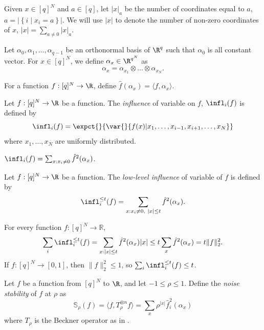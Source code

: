 \begin{definition}
  Given $x\in [q]^N$ and $a\in[q]$, let $|x|_a$ be the number of coordinates
equal to $a$, $a=\left| \left\{ i\mid x_i = a\right\}\right|$.
We will use $|x|$ to denote the number of non-zero coordinates of $x$,
$|x| = \sum_{a\neq 0} |x|_a$.
\end{definition}
\begin{definition}
  Let $\alpha_0,\alpha_1,\ldots,\alpha_{q-1}$ be an orthonormal basis
  of $\R^q$ such that $\alpha_0$ is all constant vector. For
  $x\in[q]^N$, we define $\alpha_x \in \R^{q^N}$ as
  \[ \alpha_x = \alpha_{x_1}\otimes \ldots \otimes \alpha_{x_N}.\] 
\end{definition}
\begin{definition}
  For a function $f:[q]^N\to\R$, define $\hat{f}(\alpha_x) =
  \langle f, \alpha_x \rangle$.
\end{definition}
%
\begin{definition}
  Let $f:[q]^N\rightarrow \R$ be a function. The
  \emph{influence} of  variable on $f$, $\infl_i(f)$ is
  defined by
  \[ \infl_i(f) = 
      \expct{}
            {\var{}{f(x)|x_1,\ldots,x_{i-1},x_{i+1},\ldots,x_N}}\]
  where $x_1,\ldots,x_N$ are uniformly distributed.
%
\end{definition}
\begin{observation}
  $\infl_i (f) = \sum_{x:x_i\neq 0} \hat{f}^2(\alpha_x)$.
\end{observation}
%
\begin{definition}
  Let $f:[q]^N\rightarrow \R$ be a function. The \emph{low-level
    influence} of  variable of $f$ is defined by
  \[ \infl_i^{\le t}(f) = \sum_{x:x_i\neq 0,\ |x|\le t} \hat{f}^2(\alpha_x).\]
\end{definition}
%
\begin{observation}
  For every function $f:[q]^N\to\mathbb{R}$, \[\sum_i \infl_i^{\le
    t}(f) = \sum_{x:|x|\le t} \hat{f}^2(\alpha_x) |x|\le t \sum_x
  \hat{f}^2(\alpha_x) = t \|f\|^2_2.\] If $f:[q]^N\to[0,1]$, then
  $\|f\|^2_2 \le 1$, so $\sum_i \infl_i^{\le t}(f) \le t$.
\end{observation}
%
\begin{definition}
  Let $f$ be a function from $[q]^N$ to $\R$, and let $-1\le \rho\le
  1$. Define the \emph{noise stability} of $f$ at $\rho$ as
  \[ \mathbb{S}_{\rho}(f) = \langle f, T^{\otimes n}_\rho f\rangle =
  \sum_x \rho^{|x|} \hat{f}^2_i(\alpha_x)\] where $T_{\rho}$ is the
  Beckner operator as in .
\end{definition}
